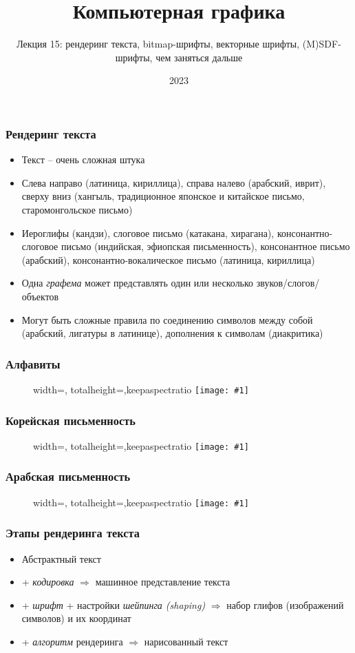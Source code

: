 \documentclass{beamer}
\title{Компьютерная графика}
\subtitle{Лекция 15: рендеринг текста, bitmap-шрифты, векторные шрифты, (M)SDF-шрифты, чем заняться дальше}
\date{2023}
\newcommand{\slideimage}[1]{
  \begin{figure}
    \begin{adjustbox}{width=\textwidth, totalheight=\textheight-2\baselineskip-2\baselineskip,keepaspectratio}
      \texttt{[image: \#1]}
    \end{adjustbox}
  \end{figure}
}
\begin{document}
\frame{\titlepage}

\begin{frame}[fragile]
\frametitle{Рендеринг текста}
\begin{itemize}
\item Текст -- очень сложная штука
\pause
\item Слева направо (латиница, кириллица), справа налево (арабский, иврит), сверху вниз (хангыль, традиционное японское и китайское письмо, старомонгольское письмо)
\pause
\item Иероглифы (кандзи), слоговое письмо (катакана, хирагана), консонантно-слоговое письмо (индийская, эфиопская письменность), консонантное письмо (арабский), консонантно-вокалическое письмо (латиница, кириллица)
\pause
\item Одна \textit{графема} может представлять один или несколько звуков/слогов/объектов
\pause
\item Могут быть сложные правила по соединению символов между собой (арабский, лигатуры в латинице), дополнения к символам (диакритика)
\end{itemize}
\end{frame}

\begin{frame}[fragile]
\frametitle{Алфавиты}
\slideimage{alphabet.jpg}
\end{frame}

\begin{frame}[fragile]
\frametitle{Корейская письменность}
\slideimage{korean.png}
\end{frame}

\begin{frame}[fragile]
\frametitle{Арабская письменность}
\slideimage{arabic.png}
\end{frame}

\begin{frame}[fragile]
\frametitle{Этапы рендеринга текста}
\begin{itemize}
\item Абстрактный текст
\pause
\item + \textit{кодировка} \begin{math}\Longrightarrow\end{math} машинное представление текста
\pause
\item + \textit{шрифт} + настройки \textit{шейпинга (shaping)} \begin{math}\Longrightarrow\end{math} набор глифов (изображений символов) и их координат
\pause
\item + \textit{алгоритм} рендеринга \begin{math}\Longrightarrow\end{math} нарисованный текст
\end{itemize}
\end{frame}
\end{document}

